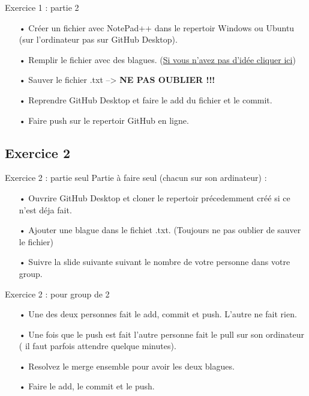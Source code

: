 \documentclass{beamer}
\begin{document}
\begin{frame}{Exercice 1 : partie 2}
    \begin{itemize}
    \item[•] Créer un fichier avec NotePad++ dans le repertoir Windows ou Ubuntu (sur l'ordinateur pas sur GitHub Desktop).
    \item[•] Remplir le fichier avec des blagues. (\href{https://linuxfr.org/news/blagues-d-informaticiens}{Si vous n'avez pas d'idée cliquer ici})
    \item[•] Sauver le fichier .txt --> \textbf{NE PAS OUBLIER !!!}
    \item[•] Reprendre GitHub Desktop et faire le add du fichier et le commit.
    \item[•] Faire push sur le repertoir GitHub en ligne.
    \end{itemize}
\end{frame}
\subsection{Exercice 2}
\begin{frame}{Exercice 2 : partie seul}
    Partie à faire seul (chacun sur son ardinateur) :
    \begin{itemize}
    \item[•] Ouvrire GitHub Desktop et cloner le repertoir précedemment créé si ce n'est déja fait.
    \item[•] Ajouter une blague dans le fichiet .txt. (Toujours ne pas oublier de sauver le fichier)
    \item[•] Suivre la slide suivante suivant le nombre de votre personne dans votre group.
    \end{itemize}
\end{frame}

\begin{frame}{Exercice 2 : pour group de 2}
    \begin{itemize}
    \item[•] Une des deux personnes fait le add, commit et push. L'autre ne fait rien.
    \item[•] Une fois que le push est fait l'autre personne fait le pull sur son ordinateur ( il faut parfois attendre quelque minutes).
    \item[•] Resolvez le merge ensemble pour avoir les deux blagues.
    \item[•] Faire le add, le commit et le push.
    \end{itemize}
\end{frame}
\end{document}
